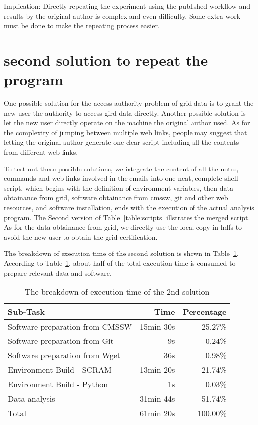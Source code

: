 \documentclass{acm_proc_article-sp}
\begin{document}
Implication: Directly repeating the experiment using the published workflow and results by the original author is complex and even difficulty. Some extra work must be done to make the repeating process easier.

\section{second solution to repeat the program}
One possible solution for the access authority problem of grid data is to grant the new user the authority to access gird data directly. Another possible solution is let the new user directly operate on the machine the original author used. As for the complexity of jumping between multiple web links, people may suggest that letting the original author generate one clear script including all the contents from different web links.

To test out these possible solutions, we integrate the content of all the notes, commands and web links involved in the emails into one neat, complete shell script, which begins with the definition of environment variables, then data obtainance from grid, software obtainance from cmssw, git and other web resources, and software installation, ends with the execution of the actual analysis program. The Second version of Table~\ref{table:scripts} illstrates the merged script. As for the data obtainance from grid, we directly use the local copy in hdfs to avoid the new user to obtain the grid certification.

The breakdown of execution time of the second solution is shown in Table~\ref{table:time-2nd}. According to Table~\ref{table:time-2nd}, about half of the total execution time is consumed to prepare relevant data and software.

\begin{table}
    \centering
    \begin{tabular}{|l|r|r|}
    \hline
    Sub-Task & Time & Percentage \\ \hline
    Software preparation from CMSSW & 15min 30s & 25.27\% \\ \hline
    Software preparation from Git & 9s & 0.24\% \\ \hline
    Software preparation from Wget & 36s & 0.98\% \\ \hline
    Environment Build - SCRAM & 13min 20s & 21.74\% \\ \hline
    Environment Build - Python & 1s & 0.03\% \\ \hline
    Data analysis & 31min 44s & 51.74\% \\ \hline
    Total & 61min 20s & 100.00\% \\ \hline
    \end{tabular}
    \caption{The breakdown of execution time of the 2nd solution}
    \label{table:time-2nd}
\end{table}
\end{document}
